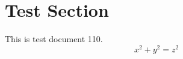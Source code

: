 \documentclass{article}
\begin{document}
\section{Test Section}
This is test document 110.
\begin{equation}
x^2 + y^2 = z^2
\end{equation}
\end{document}

